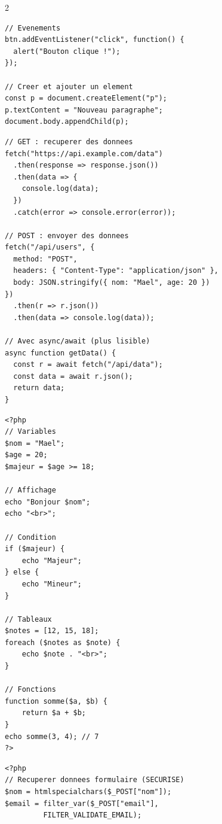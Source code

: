 \documentclass[a4paper,10pt]{article}
\begin{document}
\begin{multicols}{2}
\begin{tcolorbox}[basebox, colframe=navy, title=5. JavaScript — Manipulation du DOM]
\begin{lstlisting}[style=js]
// Evenements
btn.addEventListener("click", function() {
  alert("Bouton clique !");
});

// Creer et ajouter un element
const p = document.createElement("p");
p.textContent = "Nouveau paragraphe";
document.body.appendChild(p);
\end{lstlisting}
\end{tcolorbox}

\begin{tcolorbox}[basebox, colframe=navy, title=6. JavaScript — Fetch API (AJAX)]
\begin{lstlisting}[style=js]
// GET : recuperer des donnees
fetch("https://api.example.com/data")
  .then(response => response.json())
  .then(data => {
    console.log(data);
  })
  .catch(error => console.error(error));

// POST : envoyer des donnees
fetch("/api/users", {
  method: "POST",
  headers: { "Content-Type": "application/json" },
  body: JSON.stringify({ nom: "Mael", age: 20 })
})
  .then(r => r.json())
  .then(data => console.log(data));

// Avec async/await (plus lisible)
async function getData() {
  const r = await fetch("/api/data");
  const data = await r.json();
  return data;
}
\end{lstlisting}
\end{tcolorbox}

\begin{tcolorbox}[basebox, colframe=green, title=7. PHP — Bases côté serveur]
\begin{lstlisting}[style=php]
<?php
// Variables
$nom = "Mael";
$age = 20;
$majeur = $age >= 18;

// Affichage
echo "Bonjour $nom";
echo "<br>";

// Condition
if ($majeur) {
    echo "Majeur";
} else {
    echo "Mineur";
}

// Tableaux
$notes = [12, 15, 18];
foreach ($notes as $note) {
    echo $note . "<br>";
}

// Fonctions
function somme($a, $b) {
    return $a + $b;
}
echo somme(3, 4); // 7
?>
\end{lstlisting}
\end{tcolorbox}

\begin{tcolorbox}[basebox, colframe=green, title=8. PHP — Formulaires et BDD]
\begin{lstlisting}[style=php]
<?php
// Recuperer donnees formulaire (SECURISE)
$nom = htmlspecialchars($_POST["nom"]);
$email = filter_var($_POST["email"],
         FILTER_VALIDATE_EMAIL);


\end{lstlisting}
\end{tcolorbox}
\end{multicols}
\end{document}
